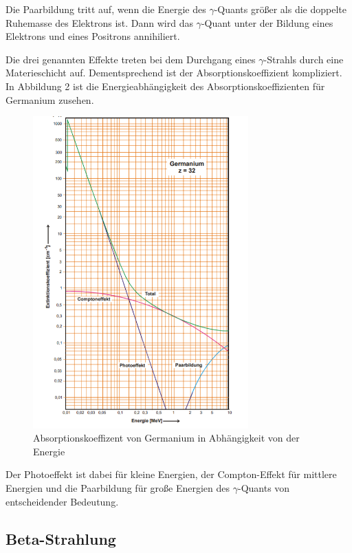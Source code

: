 Die Paarbildung tritt auf, wenn die Energie des $\gamma$-Quants größer als die doppelte Ruhemasse des Elektrons ist. Dann
wird das $\gamma$-Quant unter der Bildung eines Elektrons und eines Positrons annihiliert.

Die drei genannten Effekte treten bei dem Durchgang eines $\gamma$-Strahls durch eine Materieschicht auf. Dementsprechend ist
der Absorptionskoeffizient kompliziert. In Abbildung 2 ist die Energieabhängigkeit des Absorptionskoeffizienten für Germanium zusehen.

\begin{figure}[H]
  \centering
  \includegraphics[height=12cm]{absorptionskoeffizient.PNG}
  \caption{Absorptionskoeffizent von Germanium in Abhängigkeit von der Energie \cite{sample}}
  \label{fig:Linienspektrum}
\end{figure}

Der Photoeffekt ist dabei für kleine Energien, der Compton-Effekt für mittlere Energien und die Paarbildung für
große Energien des $\gamma$-Quants von entscheidender Bedeutung.


\subsection{Beta-Strahlung}

